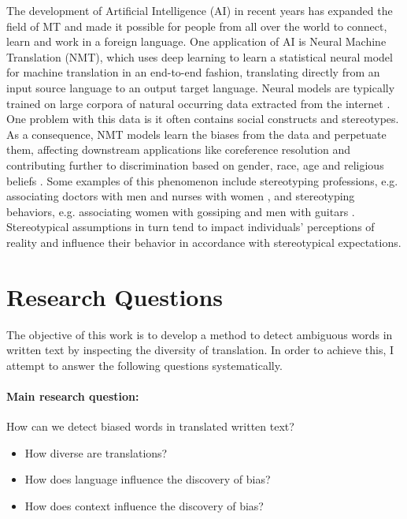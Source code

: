 The development of Artificial Intelligence (AI) in recent years has expanded the field of MT and made it possible for people from all over the world to connect, learn and work in a foreign language. One application of AI is Neural Machine Translation (NMT), which uses deep learning to learn a statistical neural model for machine translation in an end-to-end fashion, translating directly from an input source language to an output target language. Neural models are typically trained on large corpora of natural occurring data extracted from the internet \parencite{NMT}. 
One problem with this data is it often contains social constructs and stereotypes. As a consequence, NMT models learn the biases from the data and perpetuate them, affecting downstream applications like coreference resolution \parencite{Zhao_2018_coreference} and contributing further to discrimination based on gender, race, age and religious beliefs \parencite{Rudinger_2017}. Some examples of this phenomenon include stereotyping professions, e.g. associating doctors with men and nurses with women \parencite{Escud_Font_2019}, and stereotyping behaviors, e.g. associating women with gossiping and men with guitars \parencite{Rudinger_2017}. Stereotypical assumptions in turn tend to impact individuals' perceptions of reality and influence their behavior in accordance with stereotypical expectations.

\section{Research Questions}
\label{sec:Introduction:Questions}

The objective of this work is to develop a method to detect ambiguous words in written text by inspecting the diversity of translation. In order to achieve this, I attempt to answer the following questions systematically.

\paragraph{Main research question: } How can we detect biased words in translated written text?
\begin{itemize}
    \item How diverse are translations?
    \item How does language influence the discovery of bias? 
    \item How does context influence the discovery of bias? 
\end{itemize}

